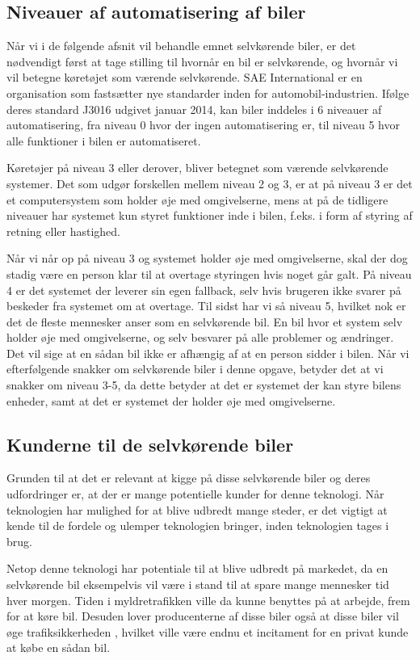 \subsection{Niveauer af automatisering af biler}
Når vi i de følgende afsnit vil behandle emnet selvkørende biler, er det nødvendigt først at tage stilling til hvornår en bil er selvkørende, og hvornår vi vil betegne køretøjet som værende selvkørende. SAE International er en organisation som fastsætter nye standarder inden for automobil-industrien. Ifølge deres standard J3016 udgivet januar 2014, kan biler inddeles i 6 niveauer af automatisering, fra niveau 0 hvor der ingen automatisering er, til niveau 5 hvor alle funktioner i bilen er automatiseret\cite{SAE_J3016}. 

Køretøjer på niveau 3 eller derover, bliver betegnet som værende selvkørende systemer. Det som udgør forskellen mellem niveau 2 og 3, er at på niveau 3 er det et computersystem som holder øje med omgivelserne, mens at på de tidligere niveauer har systemet kun styret funktioner inde i bilen, f.eks. i form af styring af retning eller hastighed.

Når vi når op på niveau 3 og systemet holder øje med omgivelserne, skal der dog stadig være en person klar til at overtage styringen hvis noget går galt. På niveau 4 er det systemet der leverer sin egen fallback, selv hvis brugeren ikke svarer på beskeder fra systemet om at overtage. Til sidst har vi så niveau 5, hvilket nok er det de fleste mennesker anser som en selvkørende bil. En bil hvor et system selv holder øje med omgivelserne, og selv besvarer på alle problemer og ændringer. Det vil sige at en sådan bil ikke er afhængig af at en person sidder i bilen. Når vi efterfølgende snakker om selvkørende biler i denne opgave, betyder det at vi snakker om niveau 3-5, da dette betyder at det er systemet der kan styre bilens enheder, samt at det er systemet der holder øje med omgivelserne.

\subsection{Kunderne til de selvkørende biler}
Grunden til at det er relevant at kigge på disse selvkørende biler og deres udfordringer er, at der er mange potentielle kunder for denne teknologi. Når teknologien har mulighed for at blive udbredt mange steder, er det vigtigt at kende til de fordele og ulemper teknologien bringer, inden teknologien tages i brug.

Netop denne teknologi har potentiale til at blive udbredt på markedet, da en selvkørende bil eksempelvis vil være i stand til at spare mange mennesker tid hver morgen. Tiden i myldretrafikken ville da kunne benyttes på at arbejde, frem for at køre bil. Desuden lover producenterne af disse biler også at disse biler vil øge trafiksikkerheden \cite{GOOG_SITE}, hvilket ville være endnu et incitament for en privat kunde at købe en sådan bil.

